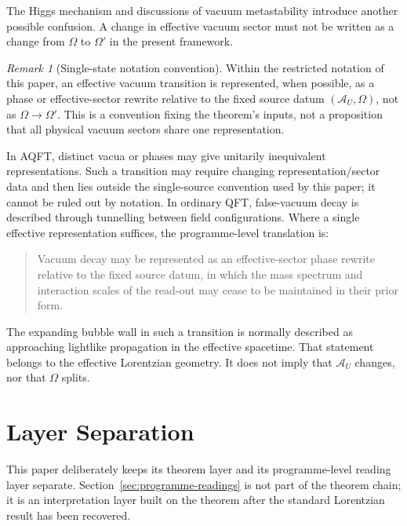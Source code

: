 \documentclass[12pt,a4paper]{article}
\theoremstyle{definition}
\theoremstyle{remark}
\newtheorem{remark}[theorem]{Remark}
\newcommand{\AU}{\mathcal{A}_U}
\newcommand{\Omegastate}{\Omega}
\begin{document}
The Higgs mechanism and discussions of vacuum metastability introduce another possible confusion. A change in effective vacuum sector must not be written as a change from $\Omegastate$ to $\Omegastate'$ in the present framework.

\begin{remark}[Single-state notation convention]
Within the restricted notation of this paper, an effective vacuum transition is represented, when possible, as a phase or effective-sector rewrite relative to the fixed source datum $(\AU,\Omegastate)$, not as $\Omegastate\to\Omegastate'$.  This is a convention fixing the theorem's inputs, not a proposition that all physical vacuum sectors share one representation.
\end{remark}

In AQFT, distinct vacua or phases may give unitarily inequivalent representations.  Such a transition may require changing representation/sector data and then lies outside the single-source convention used by this paper; it cannot be ruled out by notation.  In ordinary QFT, false-vacuum decay is described through tunnelling between field configurations.  Where a single effective representation suffices, the programme-level translation is:

\begin{quote}
Vacuum decay may be represented as an effective-sector phase rewrite relative to the fixed source datum, in which the mass spectrum and interaction scales of the read-out may cease to be maintained in their prior form.
\end{quote}

The expanding bubble wall in such a transition is normally described as approaching lightlike propagation in the effective spacetime. That statement belongs to the effective Lorentzian geometry. It does not imply that $\AU$ changes, nor that $\Omegastate$ splits.

\section{Layer Separation}
\label{sec:layers}

This paper deliberately keeps its theorem layer and its programme-level reading layer separate. Section~\ref{sec:programme-readings} is not part of the theorem chain; it is an interpretation layer built on the theorem after the standard Lorentzian result has been recovered.
\end{document}
